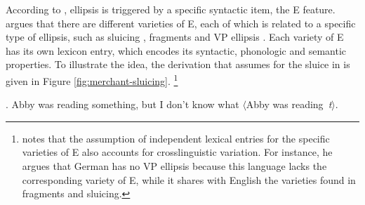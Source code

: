 According to \citet{merchant2004}, ellipsis is triggered by a specific syntactic item, the E feature. \citeauthor{merchant2004} argues that there are different varieties of E, each of which is related to a specific type of ellipsis, such as sluicing \citep{merchant2001}, fragments \citep{merchant2004} and VP ellipsis \citep{merchant2013}. Each variety of E has its own lexicon entry, which encodes its syntactic, phonologic and semantic properties. To illustrate the idea, the derivation that \citeauthor{merchant2004} assumes for the sluice in \Next is given in Figure \ref{fig:merchant-sluicing}.%
%
\footnote{\citet[671]{merchant2004} notes that the assumption of independent lexical entries for the specific varieties of E also accounts for crosslinguistic variation. For instance, he argues that German has no VP ellipsis because this language lacks the corresponding variety of E, while it shares with English the varieties found in fragments and sluicing.}\afterfn%
%

\ex. Abby was reading something, but I don’t know what $\langle$Abby was reading~\textit{t}$\rangle$.\label{ex:merchant-sluicing} \mbox{}\hfill \citep[670]{merchant2004}

